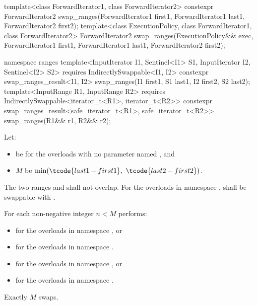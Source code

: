 %
\begin{itemdecl}
template<class ForwardIterator1, class ForwardIterator2>
  constexpr ForwardIterator2
    swap_ranges(ForwardIterator1 first1, ForwardIterator1 last1,
                ForwardIterator2 first2);
template<class ExecutionPolicy, class ForwardIterator1, class ForwardIterator2>
  ForwardIterator2
    swap_ranges(ExecutionPolicy&& exec,
                ForwardIterator1 first1, ForwardIterator1 last1,
                ForwardIterator2 first2);

namespace ranges {
  template<InputIterator I1, Sentinel<I1> S1, InputIterator I2, Sentinel<I2> S2>
    requires IndirectlySwappable<I1, I2>
    constexpr swap_ranges_result<I1, I2>
      swap_ranges(I1 first1, S1 last1, I2 first2, S2 last2);
  template<InputRange R1, InputRange R2>
    requires IndirectlySwappable<iterator_t<R1>, iterator_t<R2>>
    constexpr swap_ranges_result<safe_iterator_t<R1>, safe_iterator_t<R2>>
      swap_ranges(R1&& r1, R2&& r2);
}
\end{itemdecl}

\begin{itemdescr}
\pnum
Let:
\begin{itemize}
\item
   be 
  for the overloads with no parameter named , and
\item $M$ be $\min(\tcode{last1 - first1}, \ \tcode{last2 - first2})$.
\end{itemize}

\pnum
\requires
The two ranges  and 
shall not overlap.
For the overloads in namespace ,
 shall be swappable with
.

\pnum
\effects
For each non-negative integer $n < M$ performs:
\begin{itemize}
\item
  for the overloads in namespace , or
\item
  for the overloads in namespace .
\end{itemize}

\pnum
\returns
\begin{itemize}
\item
  for the overloads in namespace , or
\item
  for the overloads in namespace .
\end{itemize}

\pnum
\complexity
Exactly $M$ swaps.
\end{itemdescr}

